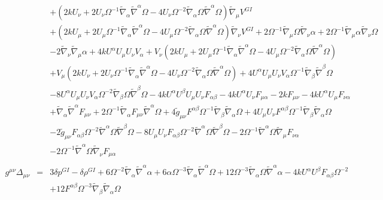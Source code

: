 \documentclass[10pt,letterpaper]{article}
\numberwithin{equation}{section}
\begin{document}
\begin{eqnarray}
&& + (2 k U_{\nu } + 2 U_{\nu } \Omega^{-1} \tilde{\nabla}_{\alpha }\tilde{\nabla}^{\alpha }\Omega - 4 U_{\nu } \Omega^{-2} \tilde{\nabla}_{\alpha }\Omega \tilde{\nabla}^{\alpha }\Omega) \tilde{\nabla}_{\mu }V^{GI}{} \nonumber \\ 
&& + (2 k U_{\mu } + 2 U_{\mu } \Omega^{-1} \tilde{\nabla}_{\alpha }\tilde{\nabla}^{\alpha }\Omega - 4 U_{\mu } \Omega^{-2} \tilde{\nabla}_{\alpha }\Omega \tilde{\nabla}^{\alpha }\Omega) \tilde{\nabla}_{\nu }V^{GI}{} + 2 \Omega^{-1} \tilde{\nabla}_{\mu }\Omega \tilde{\nabla}_{\nu }\alpha + 2 \Omega^{-1} \tilde{\nabla}_{\mu }\alpha \tilde{\nabla}_{\nu }\Omega \nonumber \\ 
&& - 2 \tilde{\nabla}_{\nu }\tilde{\nabla}_{\mu }\alpha +4 k U^{\alpha } U_{\mu } U_{\nu } V_{\alpha } + V_{\nu } (2 k U_{\mu } + 2 U_{\mu } \Omega^{-1} \tilde{\nabla}_{\alpha }\tilde{\nabla}^{\alpha }\Omega - 4 U_{\mu } \Omega^{-2} \tilde{\nabla}_{\alpha }\Omega \tilde{\nabla}^{\alpha }\Omega) \nonumber \\ 
&& + V_{\mu } (2 k U_{\nu } + 2 U_{\nu } \Omega^{-1} \tilde{\nabla}_{\alpha }\tilde{\nabla}^{\alpha }\Omega - 4 U_{\nu } \Omega^{-2} \tilde{\nabla}_{\alpha }\Omega \tilde{\nabla}^{\alpha }\Omega) + 4 U^{\alpha } U_{\mu } U_{\nu } V_{\alpha } \Omega^{-1} \tilde{\nabla}_{\beta }\tilde{\nabla}^{\beta }\Omega \nonumber \\ 
&& - 8 U^{\alpha } U_{\mu } U_{\nu } V_{\alpha } \Omega^{-2} \tilde{\nabla}_{\beta }\Omega \tilde{\nabla}^{\beta }\Omega -4 k U^{\alpha } U^{\beta } U_{\mu } U_{\nu } F_{\alpha \beta } - 4 k U^{\alpha } U_{\nu } F_{\mu \alpha } - 2 k F_{\mu \nu } - 4 k U^{\alpha } U_{\mu } F_{\nu \alpha } \nonumber \\ 
&& + \tilde{\nabla}_{\alpha }\tilde{\nabla}^{\alpha }F_{\mu \nu } + 2 \Omega^{-1} \tilde{\nabla}_{\alpha }F_{\mu \nu } \tilde{\nabla}^{\alpha }\Omega + 4 \tilde{g}_{\mu \nu } F^{\alpha \beta } \Omega^{-1} \tilde{\nabla}_{\beta }\tilde{\nabla}_{\alpha }\Omega + 4 U_{\mu } U_{\nu } F^{\alpha \beta } \Omega^{-1} \tilde{\nabla}_{\beta }\tilde{\nabla}_{\alpha }\Omega \nonumber \\ 
&& - 2 \tilde{g}_{\mu \nu } F_{\alpha \beta } \Omega^{-2} \tilde{\nabla}^{\alpha }\Omega \tilde{\nabla}^{\beta }\Omega - 8 U_{\mu } U_{\nu } F_{\alpha \beta } \Omega^{-2} \tilde{\nabla}^{\alpha }\Omega \tilde{\nabla}^{\beta }\Omega - 2 \Omega^{-1} \tilde{\nabla}^{\alpha }\Omega \tilde{\nabla}_{\mu }F_{\nu \alpha } \nonumber \\ 
&& - 2 \Omega^{-1} \tilde{\nabla}^{\alpha }\Omega \tilde{\nabla}_{\nu }F_{\mu \alpha }
\label{DeltaGI}\\  \nonumber\\ 
g^{\mu\nu}\Delta_{\mu\nu}&=& 3 \delta p^{GI}{} -  \delta \rho^{GI}{} + 6 \Omega^{-2} \tilde{\nabla}_{\alpha }\tilde{\nabla}^{\alpha }\alpha + 6 \alpha \Omega^{-3} \tilde{\nabla}_{\alpha }\tilde{\nabla}^{\alpha }\Omega + 12 \Omega^{-3} \tilde{\nabla}_{\alpha }\Omega \tilde{\nabla}^{\alpha }\alpha -4 k U^{\alpha } U^{\beta } F_{\alpha \beta } \Omega^{-2} \nonumber \\ 
&& + 12 F^{\alpha \beta } \Omega^{-3} \tilde{\nabla}_{\beta }\tilde{\nabla}_{\alpha }\Omega 
\end{eqnarray}
\end{document}
